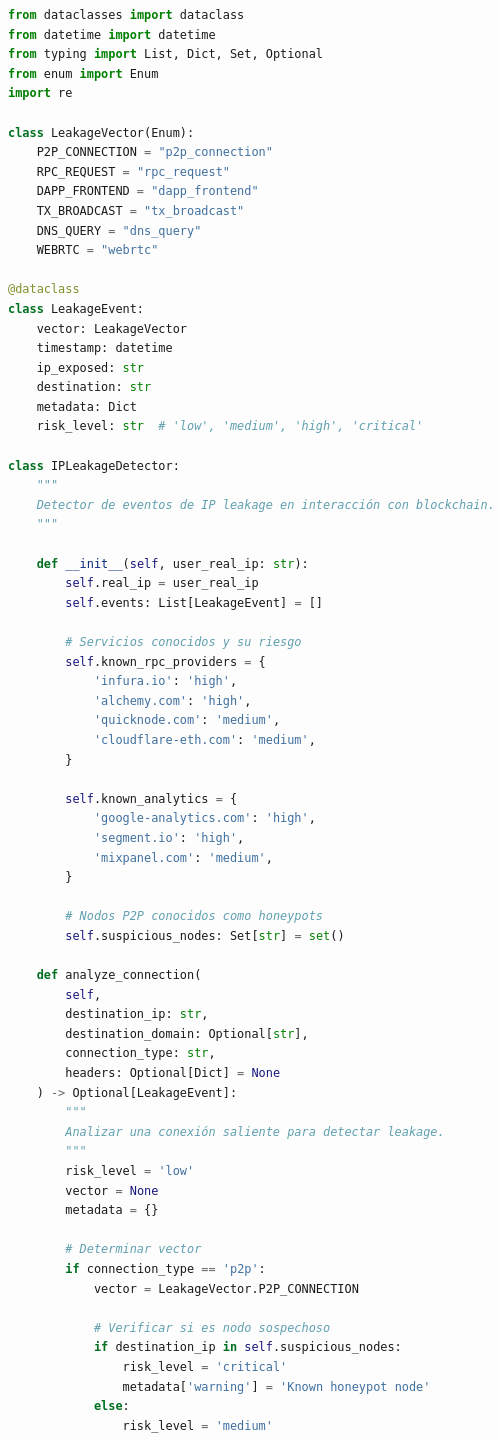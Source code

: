 \documentclass[11pt,a4paper,twoside]{book}
\theoremstyle{definition}
\theoremstyle{remark}
\begin{document}
\begin{lstlisting}[language=Python, caption={Detector de IP Leakage}]
from dataclasses import dataclass
from datetime import datetime
from typing import List, Dict, Set, Optional
from enum import Enum
import re

class LeakageVector(Enum):
    P2P_CONNECTION = "p2p_connection"
    RPC_REQUEST = "rpc_request"
    DAPP_FRONTEND = "dapp_frontend"
    TX_BROADCAST = "tx_broadcast"
    DNS_QUERY = "dns_query"
    WEBRTC = "webrtc"

@dataclass
class LeakageEvent:
    vector: LeakageVector
    timestamp: datetime
    ip_exposed: str
    destination: str
    metadata: Dict
    risk_level: str  # 'low', 'medium', 'high', 'critical'

class IPLeakageDetector:
    """
    Detector de eventos de IP leakage en interacción con blockchain.
    """
    
    def __init__(self, user_real_ip: str):
        self.real_ip = user_real_ip
        self.events: List[LeakageEvent] = []
        
        # Servicios conocidos y su riesgo
        self.known_rpc_providers = {
            'infura.io': 'high',
            'alchemy.com': 'high',
            'quicknode.com': 'medium',
            'cloudflare-eth.com': 'medium',
        }
        
        self.known_analytics = {
            'google-analytics.com': 'high',
            'segment.io': 'high',
            'mixpanel.com': 'medium',
        }
        
        # Nodos P2P conocidos como honeypots
        self.suspicious_nodes: Set[str] = set()
    
    def analyze_connection(
        self,
        destination_ip: str,
        destination_domain: Optional[str],
        connection_type: str,
        headers: Optional[Dict] = None
    ) -> Optional[LeakageEvent]:
        """
        Analizar una conexión saliente para detectar leakage.
        """
        risk_level = 'low'
        vector = None
        metadata = {}
        
        # Determinar vector
        if connection_type == 'p2p':
            vector = LeakageVector.P2P_CONNECTION
            
            # Verificar si es nodo sospechoso
            if destination_ip in self.suspicious_nodes:
                risk_level = 'critical'
                metadata['warning'] = 'Known honeypot node'
            else:
                risk_level = 'medium'
                

\end{lstlisting}
\end{document}

